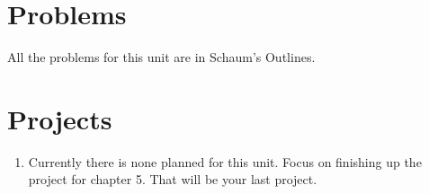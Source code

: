 

\section{Problems}

All the problems for this unit are in Schaum's Outlines.

%
%
%
%

























\section{Projects}


\begin{enumerate}
\item Currently there is none planned for this unit.  Focus on finishing up the project for chapter 5.  That will be your last project.
\end{enumerate}


